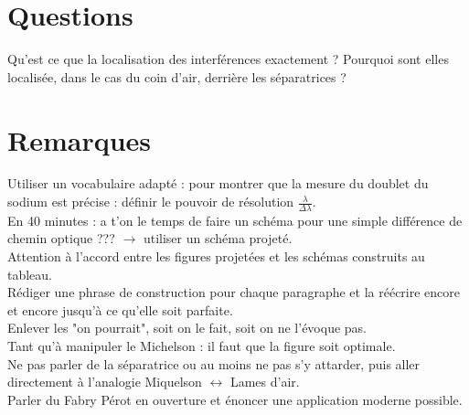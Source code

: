 \documentclass[12pt,prb,aps,epsf]{report}
\begin{document}
\section{Questions}
Qu'est ce que la localisation des interférences exactement ? Pourquoi sont elles localisée, dans le cas du coin d'air, derrière les séparatrices ?\\

\section{Remarques}
Utiliser un vocabulaire adapté : pour montrer que la mesure du doublet du sodium est précise : définir le pouvoir de résolution $\frac{\lambda}{\Delta \lambda}$.\\
En 40 minutes : a t'on le temps de faire un schéma pour une simple différence de chemin optique ??? $\rightarrow$ utiliser un schéma projeté.\\
Attention à l'accord entre les figures projetées et les schémas construits au tableau.\\
Rédiger une phrase de construction pour chaque paragraphe et la réécrire encore et encore jusqu'à ce qu'elle soit parfaite.\\
Enlever les "on pourrait", soit on le fait, soit on ne l'évoque pas.\\
Tant qu'à manipuler le Michelson : il faut que la figure soit optimale.\\
Ne pas parler de la séparatrice ou au moins ne pas s'y attarder, puis aller directement à l'analogie Miquelson $\leftrightarrow$ Lames d'air.\\
Parler du Fabry Pérot en ouverture et énoncer une application moderne possible.
\end{document}
